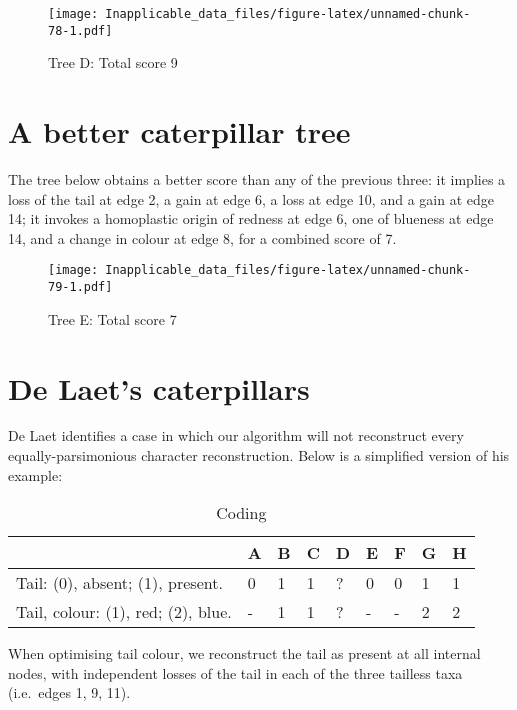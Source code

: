 \documentclass[]{book}
\theoremstyle{definition}
\theoremstyle{definition}
\theoremstyle{definition}
\theoremstyle{remark}
\begin{document}
\begin{figure}
\centering
\texttt{[image: Inapplicable\_data\_files/figure-latex/unnamed-chunk-78-1.pdf]}
\caption{\label{fig:unnamed-chunk-78}Tree D: Total score 9}
\end{figure}

\hypertarget{a-better-caterpillar-tree}{%
\section{A better caterpillar tree}\label{a-better-caterpillar-tree}}

The tree below obtains a better score than any of the previous three: it
implies a loss of the tail at edge 2, a gain at edge 6, a loss at edge
10, and a gain at edge 14; it invokes a homoplastic origin of redness at
edge 6, one of blueness at edge 14, and a change in colour at edge 8,
for a combined score of 7.

\begin{figure}
\centering
\texttt{[image: Inapplicable\_data\_files/figure-latex/unnamed-chunk-79-1.pdf]}
\caption{\label{fig:unnamed-chunk-79}Tree E: Total score 7}
\end{figure}

\hypertarget{de-laets-caterpillars}{%
\section{De Laet's caterpillars}\label{de-laets-caterpillars}}

De Laet \citeyearpar{DeLaet2017} identifies a case in which our
algorithm \citep{Brazeau2018} will not reconstruct every
equally-parsimonious character reconstruction. Below is a simplified
version of his example:

\begin{table}

\caption{\label{tab:unnamed-chunk-81}Coding}
\centering
\begin{tabular}[t]{l|l|l|l|l|l|l|l|l}
\hline
  & A & B & C & D & E & F & G & H\\
\hline
Tail: (0), absent; (1), present. & 0 & 1 & 1 & ? & 0 & 0 & 1 & 1\\
\hline
Tail, colour: (1), red; (2), blue. & - & 1 & 1 & ? & - & - & 2 & 2\\
\hline
\end{tabular}
\end{table}

When optimising tail colour, we reconstruct the tail as present at all
internal nodes, with independent losses of the tail in each of the three
tailless taxa (i.e.~edges 1, 9, 11).
\end{document}
